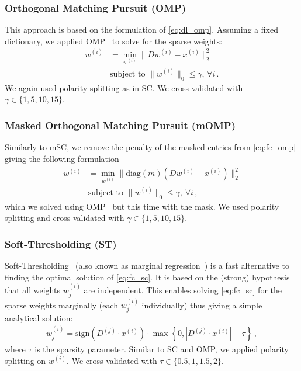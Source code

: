 \documentclass[svgnames]{scrartcl}
\begin{document}
\subsubsection{Orthogonal Matching Pursuit (OMP)}

This approach is based on the formulation of \eqref{eq:dl_omp}. Assuming a fixed dictionary, we applied OMP~\citep{pati1993orthogonal} to solve for the sparse weights:
\begin{align}
\label{eq:fc_omp}
w^{(i)} &= \min_{w^{(i)}} \| D w^{(i)} - x^{(i)} \|_2^2 \\
& \text{subject to } \| w^{(i)} \|_0 \leq \gamma, \, \forall i \nonumber \, .
\end{align}
We again used polarity splitting as in SC. We cross-validated with $\gamma \in \{1, 5, 10, 15\}$.

\subsubsection{Masked Orthogonal Matching Pursuit (mOMP)}

Similarly to mSC, we remove the penalty of the masked entries from \eqref{eq:fc_omp} giving the following formulation
\begin{align}
w^{(i)} &= \min_{w^{(i)}} \| \text{diag}(m) (D w^{(i)} - x^{(i)}) \|_2^2 \\
& \text{subject to } \| w^{(i)} \|_0 \leq \gamma, \, \forall i \nonumber \, ,
\end{align}
which we solved using OMP~\citep{pati1993orthogonal} but this time with the mask. We used polarity splitting and cross-validated with $\gamma \in \{1, 5, 10, 15\}$.



\subsubsection{Soft-Thresholding (ST)}

Soft-Thresholding~\citep{donoho1995adapting} (also known as marginal regression~\citep{genovese2012comparison}) is a fast alternative to finding the optimal solution of \eqref{eq:fc_sc}. It is based on the (strong) hypothesis that all weights $w^{(i)}_j$ are independent. This enables solving \eqref{eq:fc_sc} for the sparse weights marginally (each $w^{(i)}_j$ individually) thus giving a simple analytical solution:
\begin{align}
w_j^{(i)} = \text{sign}(D^{(j)} \cdot x^{(i)}) \cdot \max \left\{ 0, | D^{(j)} \cdot x^{(i)} | - \tau \right\} \, ,
\end{align}
where $\tau$ is the sparsity parameter.  Similar to SC and OMP, we applied polarity splitting on $w^{(i)}$. We cross-validated with $\tau \in \{0.5, 1, 1.5, 2\}$.
\end{document}
